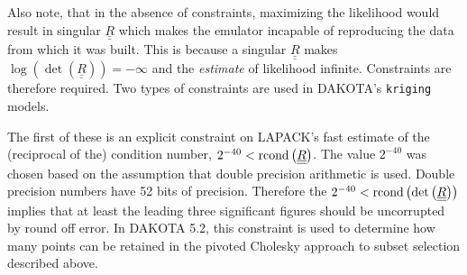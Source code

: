 Also note, that in the absence of constraints, maximizing the likelihood 
would result in singular $\underline{\underline{R}}$ which makes the 
emulator incapable of reproducing the data from which it was built.  
This is because a singular $\underline{\underline{R}}$ makes  
$\log\left(\det\left(\underline{\underline{R}}\right)\right)=-\infty$
and the {\it estimate} of likelihood infinite.  Constraints are therefore 
required.  Two types of constraints are used in DAKOTA's \texttt{kriging}
models.\newline

The first of these is an explicit constraint on LAPACK's fast
estimate of the (reciprocal of the) condition number, 
$2^{-40}<{\rm rcond}\left(\underline{\underline{R}}\right)$.  The value $2^{-40}$ was chosen based on the assumption that double
precision arithmetic is used.  Double precision numbers have 52 bits of 
precision. Therefore the  
$2^{-40}<{\rm rcond}\left(\det\left(\underline{\underline{R}}\right)\right)$ implies that at least the leading three significant figures should be 
uncorrupted by round off error.  In DAKOTA 5.2, this constraint is used
to determine how many points can be retained in the pivoted Cholesky 
approach to subset selection described above.\newline

